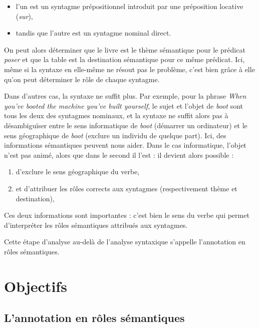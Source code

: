 \begin{itemize}
    \item l'un est un syntagme prépositionnel introduit par une préposition
        locative (\emph{sur}),
    \item tandis que l'autre est un syntagme nominal direct.
\end{itemize}

On peut alors déterminer que le livre est le thème sémantique pour le prédicat
\emph{poser} et que la table est la destination sémantique pour ce même
prédicat. Ici, même si la syntaxe en elle-même ne résout pas le problème, c'est
bien grâce à elle qu'on peut déterminer le rôle de chaque syntagme.

Dans d'autres cas, la syntaxe ne suffit plus. Par exemple, pour la phrase
\emph{When you've booted the machine you've built yourself}, le sujet et
l'objet de \emph{boot} sont tous les deux des syntagmes nominaux, et la syntaxe
ne suffit alors pas à désambiguïser entre le sens informatique de \emph{boot}
(démarrer un ordinateur) et le sens géographique de \emph{boot} (exclure un
individu de quelque part). Ici, des informations sémantiques peuvent nous
aider. Dans le cas informatique, l'objet n'est pas animé, alors que dans le
second il l'est : il devient alors possible :

\begin{enumerate}
    \item d'exclure le sens géographique du verbe,
    \item et d'attribuer les rôles corrects aux syntagmes (respectivement thème et
        destination),
\end{enumerate}


Ces deux informations sont importantes : c'est bien le sens du verbe qui permet
d'interpréter les rôles sémantiques attribués aux syntagmes.

Cette étape d'analyse au-delà de l'analyse syntaxique s'appelle l'annotation en
rôles sémantiques.

\section{Objectifs}

\subsection{L'annotation en rôles sémantiques}

